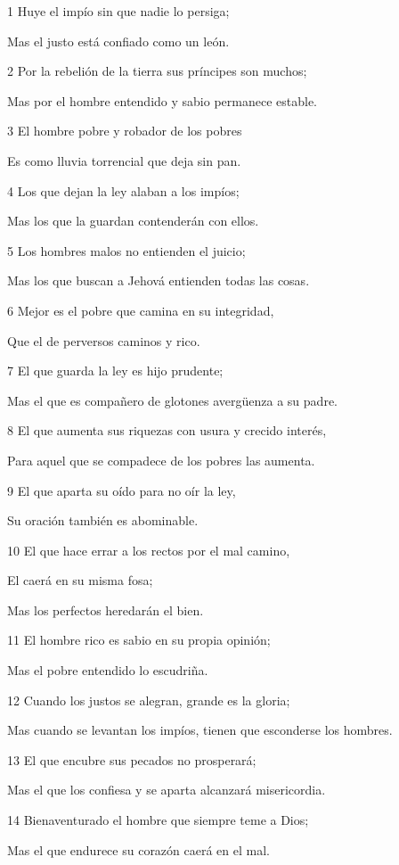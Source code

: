 \par 1 Huye el impío sin que nadie lo persiga;
\par Mas el justo está confiado como un león.
\par 2 Por la rebelión de la tierra sus príncipes son muchos;
\par Mas por el hombre entendido y sabio permanece estable.
\par 3 El hombre pobre y robador de los pobres
\par Es como lluvia torrencial que deja sin pan.
\par 4 Los que dejan la ley alaban a los impíos; 
\par Mas los que la guardan contenderán con ellos.
\par 5 Los hombres malos no entienden el juicio;
\par Mas los que buscan a Jehová entienden todas las cosas.
\par 6 Mejor es el pobre que camina en su integridad,
\par Que el de perversos caminos y rico.
\par 7 El que guarda la ley es hijo prudente;
\par Mas el que es compañero de glotones avergüenza a su padre.
\par 8 El que aumenta sus riquezas con usura y crecido interés,
\par Para aquel que se compadece de los pobres las aumenta.
\par 9 El que aparta su oído para no oír la ley,
\par Su oración también es abominable.
\par 10 El que hace errar a los rectos por el mal camino,
\par El caerá en su misma fosa;
\par Mas los perfectos heredarán el bien.
\par 11 El hombre rico es sabio en su propia opinión;
\par Mas el pobre entendido lo escudriña.
\par 12 Cuando los justos se alegran, grande es la gloria;
\par Mas cuando se levantan los impíos, tienen que esconderse los hombres.
\par 13 El que encubre sus pecados no prosperará;
\par Mas el que los confiesa y se aparta alcanzará misericordia.
\par 14 Bienaventurado el hombre que siempre teme a Dios;
\par Mas el que endurece su corazón caerá en el mal.
